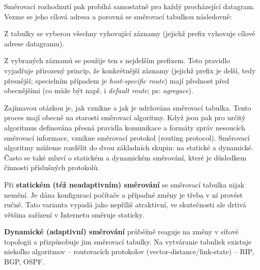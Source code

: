 Směrovací rozhodnutí pak probíhá samostatně pro každý procházející datagram. Vezme se jeho cílová adresa a porovná se směrovací tabulkou následovně:
\begin{pitemize}
	\item Z tabulky se vyberou všechny vyhovující záznamy (jejichž prefix vyhovuje cílové adrese datagramu).
	\item Z vybraných záznamů se použije ten s nejdelším prefixem. Toto pravidlo vyjadřuje přirozený princip, že konkrétnější záznamy (jejichž prefix je delší, tedy přesnější; specielním případem je \emph{host-specific route}) mají přednost před obecnějšími (co může být např. i \emph{default route}; ps: \emph{agregace}).
\end{pitemize}

Zajímavou otázkou je, jak vznikne a jak je udržována směrovací tabulka. Tento proces mají obecně na starosti směrovací algoritmy. Když jsou pak pro určitý algoritmus definována přesná pravidla komunikace a formáty zpráv nesoucích směrovací informace, vznikne směrovací protokol (routing protocol). Směrovací algoritmy můžeme rozdělit do dvou základních skupin: na statické a dynamické. Často se také mluví o statickém a dynamickém směrování, které je důsledkem činnosti příslušných protokolů.

Při \textbf{statickém (též neadaptivním) směrování} se směrovací tabulka nijak nemění. Je dána konfigurací počítače a případné změny je třeba v ní provést ručně. Tato varianta vypadá jako nepříliš atraktivní, ve skutečnosti ale drtivá většina zařízení v Internetu směruje staticky.

\textbf{Dynamické (adaptivní) směrování} průběžně reaguje na změny v síťové topologii a přizpůsobuje jim směrovací tabulky. Na vytváranie tabuliek existuje niekoľko algoritmov -- routovacích protokolov (vector-distance/link-state) -- RIP, BGP, OSPF.

